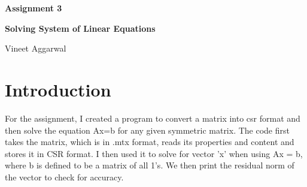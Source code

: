\documentclass[12pt]{article}
\begin{document}
	\justifying

	\begin{center}
		\textbf{{\large Assignment 3}}

		\textbf{Solving System of Linear Equations}

		Vineet Aggarwal
	\end{center}



	\section{Introduction}
    For the assignment, I created a program to convert a matrix into csr format and then solve the equation Ax=b for any given symmetric matrix. The code first takes the matrix, which is in .mtx format, reads its properties and content and stores it in CSR format. I then used it to solve for vector 'x' when using Ax = b, where b is defined to be a matrix of all 1's. We then print the residual norm of the vector to check for accuracy.
\end{document}
